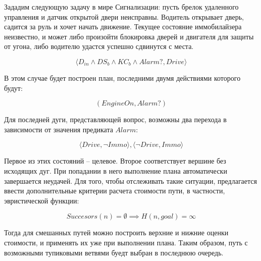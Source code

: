 Зададим следующую задачу в мире Сигнализации: пусть брелок удаленного управления и датчик открытой двери неисправны. Водитель открывает дверь, садится за руль и хочет начать движение. Текущее состояние иммобилайзера неизвестно, и может либо произойти блокировка дверей и двигателя для защиты от угона, либо водителю удастся успешно сдвинутся с места.

\begin{equation}
 \langle D_{in} \land DS_b \land KC_b \land Alarm?, Drive \rangle
\end{equation}

В этом случае будет построен план, последними двумя действиями которого будут:

\begin{equation}
 (EngineOn, Alarm?)
\end{equation}

Для последней дуги, представляющей вопрос, возможны два перехода в зависимости от значения предиката $Alarm$:

\begin{equation}
 \langle Drive, \neg Immo \rangle, \langle \neg Drive, Immo \rangle
\end{equation}

Первое из этих состояний -- целевое. Второе соответствует вершине без исходящих дуг. При попадании в него выполнение плана автоматически завершается неудачей. Для того, чтобы отслеживать такие ситуации, предлагается ввести дополнительные критерии расчета стоимости пути, в частности, эвристической функции:

\begin{equation}
 Succesors(n) = \emptyset \implies H(n, goal) = \infty
\end{equation}

Тогда для смешанных путей можно построить верхние и нижние оценки стоимости, и применять их уже при выполнении плана. Таким образом, путь с возможными тупиковыми ветвями буедт выбран в последнюю очередь.
